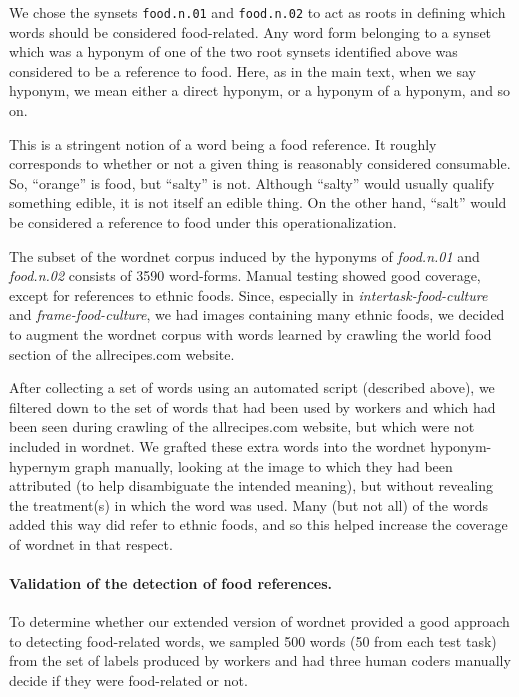 \documentclass[12pt]{article}
\begin{document}
We chose the synsets \texttt{food.n.01} and \texttt{food.n.02} to act as roots
in defining which words should be considered food-related.  Any word form
belonging to a synset which was a hyponym of one of the two root synsets
identified above was considered to be a reference to food.  Here, as in the
main text, when we say hyponym, we mean either a direct hyponym, or a hyponym
of a hyponym, and so on.

This is a stringent notion of a word being a food reference.  It roughly
corresponds to whether or not a given thing is reasonably considered 
consumable.  So, ``orange'' is food, but ``salty'' is not.  Although ``salty''
would usually qualify something edible, it is not itself an edible thing.
On the other hand, ``salt'' would be considered a reference to food under 
this operationalization.

The subset of the wordnet corpus induced by the hyponyms of \textit{food.n.01}
and \textit{food.n.02} consists of 3590 word-forms.  Manual
testing showed good coverage, except for references to ethnic foods.  
Since, especially in \textit{intertask-food-culture} and 
\textit{frame-food-culture}, we had images containing many ethnic 
foods, we decided to augment the wordnet corpus with words learned by 
crawling the world food section of the allrecipes.com website.  

After collecting a set of words using an automated script 
(described above), we filtered down to the set of words that had been used by
workers and which had been seen during crawling of the allrecipes.com website,
but which were not included in wordnet.  We grafted these extra words into
the wordnet hyponym-hypernym graph manually, looking at the image to which 
they had been attributed (to help disambiguate the intended meaning), but 
without revealing the treatment(s) in which
the word was used.  Many (but not all) of the words added this way did refer 
to ethnic foods, and so this helped increase the coverage of wordnet in that 
respect.

\paragraph{Validation of the detection of food references.}
To determine whether our extended version of wordnet provided a good approach
to detecting food-related words, we sampled 500 words 
(50 from each test task)  from the set of labels produced by workers and had 
three human coders manually decide if they were 
food-related or not.
\end{document}
